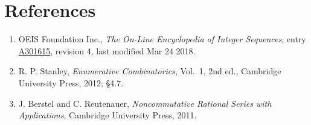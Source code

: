 \documentclass[11pt]{article}
\theoremstyle{definition}
\begin{document}
\section{References}

\begin{enumerate}

\item OEIS Foundation Inc., \emph{The On-Line Encyclopedia of Integer Sequences}, entry \href{https://oeis.org/A301615}{A301615}, revision 4, last modified Mar 24 2018.

\item R. P. Stanley, \emph{Enumerative Combinatorics}, Vol.~1, 2nd ed., Cambridge University Press, 2012; \S4.7.

\item J. Berstel and C. Reutenauer, \emph{Noncommutative Rational Series with Applications}, Cambridge University Press, 2011.

\end{enumerate}
\end{document}
